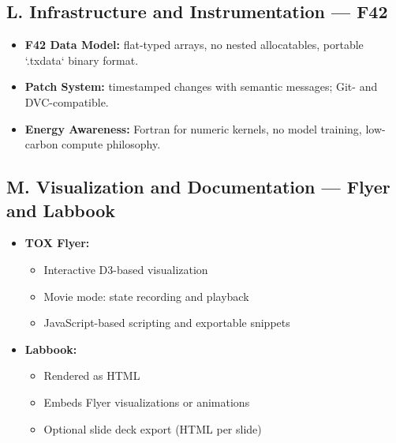 \documentclass{article}
\begin{document}
\subsection*{L. Infrastructure and Instrumentation — F42}
\begin{itemize}[leftmargin=1.5em]
  \item \textbf{F42 Data Model:} flat-typed arrays, no nested allocatables, portable `.txdata` binary format.
  \item \textbf{Patch System:} timestamped changes with semantic messages; Git- and DVC-compatible.
  \item \textbf{Energy Awareness:} Fortran for numeric kernels, no model training, low-carbon compute philosophy.
\end{itemize}

\subsection*{M. Visualization and Documentation — Flyer and Labbook}
\begin{itemize}[leftmargin=1.5em]
  \item \textbf{TOX Flyer:}
    \begin{itemize}
      \item Interactive D3-based visualization
      \item Movie mode: state recording and playback
      \item JavaScript-based scripting and exportable snippets
    \end{itemize}
  \item \textbf{Labbook:}
    \begin{itemize}
      \item Rendered as HTML
      \item Embeds Flyer visualizations or animations
      \item Optional slide deck export (HTML per slide)
    \end{itemize}
\end{itemize}
\end{document}
